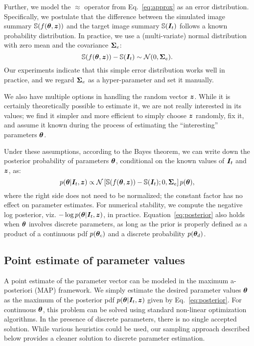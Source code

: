 Further, we model the $\approx$ operator from Eq.~\eqref{eq:approx} as an error distribution. Specifically, we postulate that the difference between the simulated image summary $\mathbb{S}(f(\bm{\theta}, \bm{z}))$ and the target %
image summary $\mathbb{S}(\bm{I}_t)$ follows a known probability distribution.
In practice, we use a (multi-variate) normal distribution with zero mean and the covariance $\bm{\Sigma}_e$:
%
\begin{equation}
\mathbb{S}(f(\bm{\theta}, \bm{z})) - \mathbb{S}(\bm{I}_t) \sim \mathcal{N}(0, \bm{\Sigma}_e).
\end{equation}
%
Our experiments indicate that this simple error distribution works well in practice, and we regard $\bm{\Sigma}_e$ as a hyper-parameter and set it manually.

We also have multiple options in handling the random vector $\bm{z}$. While it is certainly theoretically possible to estimate it, we are not really interested in its values;  we find it simpler and more efficient to simply choose $\bm{z}$ randomly, fix it, and assume it known during the process of estimating the ``interesting'' parameters $\bm{\theta}$.

Under these assumptions, according to the Bayes theorem, we can write down the posterior probability of parameters $\bm{\theta}$, conditional on the known values of $\bm{I}_t$ and $\bm{z}$, as:
%
\begin{equation} \label{eq:posterior}
p(\bm{\theta} | \bm{I}_t, \bm{z}) \propto \mathcal{N}\left[\mathbb{S}(f(\bm{\theta}, \bm{z})) - \mathbb{S}(\bm{I}_t); 0, \bm{\Sigma}_e\right] p(\bm{\theta}),
\end{equation}
%
where the right side does not need to be normalized; the constant factor has no effect on parameter estimates.
For numerical stability, we compute the negative log posterior, viz. $-\log p(\bm{\theta} | \bm{I}_t, \bm{z})$, in practice. Equation~\eqref{eq:posterior} also holds when $\bm{\theta}$ involves discrete parameters, as long as the prior is properly defined as a product of a continuous pdf $p(\bm{\theta}_c)$ and a discrete probability $p(\bm{\theta}_d)$.

\subsection{Point estimate of parameter values}

A point estimate of the parameter vector can be modeled in the maximum a-posteriori (MAP) framework. We simply estimate the desired parameter values $\bm{\theta}$ as the maximum of the posterior pdf $p(\bm{\theta} | \bm{I}_t, \bm{z})$ given by Eq.~\eqref{eq:posterior}. For continuous $\bm{\theta}$, this problem can be solved using standard non-linear optimization algorithms. In the presence of discrete parameters, there is no single accepted solution. While various heuristics could be used, our sampling approach described below provides a cleaner solution to discrete parameter estimation.

